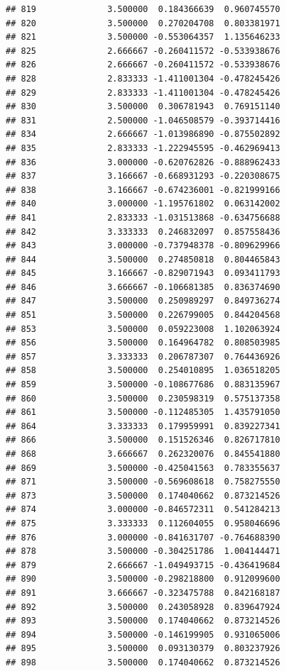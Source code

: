 \documentclass[
]{article}
\begin{document}
\begin{verbatim}
## 819              3.500000  0.184366639  0.960745570
## 820              3.500000  0.270204708  0.803381971
## 821              3.500000 -0.553064357  1.135646233
## 825              2.666667 -0.260411572 -0.533938676
## 826              2.666667 -0.260411572 -0.533938676
## 828              2.833333 -1.411001304 -0.478245426
## 829              2.833333 -1.411001304 -0.478245426
## 830              3.500000  0.306781943  0.769151140
## 831              2.500000 -1.046508579 -0.393714416
## 834              2.666667 -1.013986890 -0.875502892
## 835              2.833333 -1.222945595 -0.462969413
## 836              3.000000 -0.620762826 -0.888962433
## 837              3.166667 -0.668931293 -0.220308675
## 838              3.166667 -0.674236001 -0.821999166
## 840              3.000000 -1.195761802  0.063142002
## 841              2.833333 -1.031513868 -0.634756688
## 842              3.333333  0.246832097  0.857558436
## 843              3.000000 -0.737948378 -0.809629966
## 844              3.500000  0.274850818  0.804465843
## 845              3.166667 -0.829071943  0.093411793
## 846              3.666667 -0.106681385  0.836374690
## 847              3.500000  0.250989297  0.849736274
## 851              3.500000  0.226799005  0.844204568
## 853              3.500000  0.059223008  1.102063924
## 856              3.500000  0.164964782  0.808503985
## 857              3.333333  0.206787307  0.764436926
## 858              3.500000  0.254010895  1.036518205
## 859              3.500000 -0.108677686  0.883135967
## 860              3.500000  0.230598319  0.575137358
## 861              3.500000 -0.112485305  1.435791050
## 864              3.333333  0.179959991  0.839227341
## 866              3.500000  0.151526346  0.826717810
## 868              3.666667  0.262320076  0.845541880
## 869              3.500000 -0.425041563  0.783355637
## 871              3.500000 -0.569608618  0.758275550
## 873              3.500000  0.174040662  0.873214526
## 874              3.000000 -0.846572311  0.541284213
## 875              3.333333  0.112604055  0.958046696
## 876              3.000000 -0.841631707 -0.764688390
## 878              3.500000 -0.304251786  1.004144471
## 879              2.666667 -1.049493715 -0.436419684
## 890              3.500000 -0.298218800  0.912099600
## 891              3.666667 -0.323475788  0.842168187
## 892              3.500000  0.243058928  0.839647924
## 893              3.500000  0.174040662  0.873214526
## 894              3.500000 -0.146199905  0.931065006
## 895              3.500000  0.093130379  0.803237926
## 898              3.500000  0.174040662  0.873214526

\end{verbatim}
\end{document}
